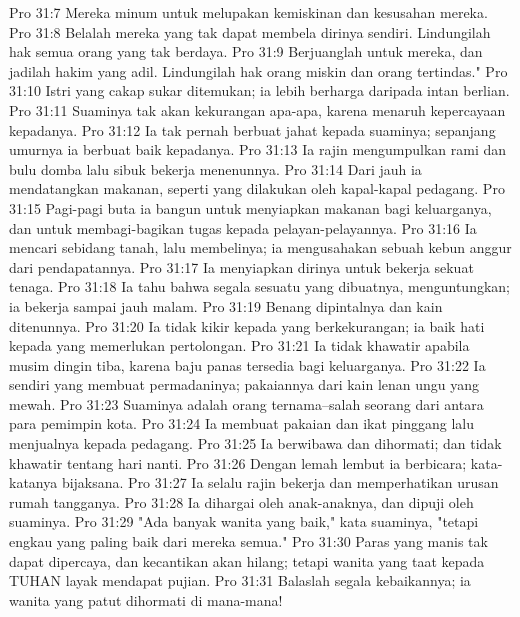 Pro 31:7  Mereka minum untuk melupakan kemiskinan dan kesusahan mereka.
Pro 31:8  Belalah mereka yang tak dapat membela dirinya sendiri. Lindungilah hak semua orang yang tak berdaya.
Pro 31:9  Berjuanglah untuk mereka, dan jadilah hakim yang adil. Lindungilah hak orang miskin dan orang tertindas."
Pro 31:10  Istri yang cakap sukar ditemukan; ia lebih berharga daripada intan berlian.
Pro 31:11  Suaminya tak akan kekurangan apa-apa, karena menaruh kepercayaan kepadanya.
Pro 31:12  Ia tak pernah berbuat jahat kepada suaminya; sepanjang umurnya ia berbuat baik kepadanya.
Pro 31:13  Ia rajin mengumpulkan rami dan bulu domba lalu sibuk bekerja menenunnya.
Pro 31:14  Dari jauh ia mendatangkan makanan, seperti yang dilakukan oleh kapal-kapal pedagang.
Pro 31:15  Pagi-pagi buta ia bangun untuk menyiapkan makanan bagi keluarganya, dan untuk membagi-bagikan tugas kepada pelayan-pelayannya.
Pro 31:16  Ia mencari sebidang tanah, lalu membelinya; ia mengusahakan sebuah kebun anggur dari pendapatannya.
Pro 31:17  Ia menyiapkan dirinya untuk bekerja sekuat tenaga.
Pro 31:18  Ia tahu bahwa segala sesuatu yang dibuatnya, menguntungkan; ia bekerja sampai jauh malam.
Pro 31:19  Benang dipintalnya dan kain ditenunnya.
Pro 31:20  Ia tidak kikir kepada yang berkekurangan; ia baik hati kepada yang memerlukan pertolongan.
Pro 31:21  Ia tidak khawatir apabila musim dingin tiba, karena baju panas tersedia bagi keluarganya.
Pro 31:22  Ia sendiri yang membuat permadaninya; pakaiannya dari kain lenan ungu yang mewah.
Pro 31:23  Suaminya adalah orang ternama--salah seorang dari antara para pemimpin kota.
Pro 31:24  Ia membuat pakaian dan ikat pinggang lalu menjualnya kepada pedagang.
Pro 31:25  Ia berwibawa dan dihormati; dan tidak khawatir tentang hari nanti.
Pro 31:26  Dengan lemah lembut ia berbicara; kata-katanya bijaksana.
Pro 31:27  Ia selalu rajin bekerja dan memperhatikan urusan rumah tangganya.
Pro 31:28  Ia dihargai oleh anak-anaknya, dan dipuji oleh suaminya.
Pro 31:29  "Ada banyak wanita yang baik," kata suaminya, "tetapi engkau yang paling baik dari mereka semua."
Pro 31:30  Paras yang manis tak dapat dipercaya, dan kecantikan akan hilang; tetapi wanita yang taat kepada TUHAN layak mendapat pujian.
Pro 31:31  Balaslah segala kebaikannya; ia wanita yang patut dihormati di mana-mana!


